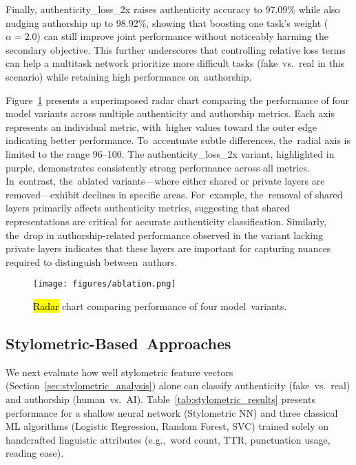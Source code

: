 \documentclass[electronics,article,accept,pdftex,moreauthors,electronics]{Definitions/mdpi}
\begin{document}
Finally, authenticity\_loss\_2x raises authenticity accuracy to 97.09\% while also nudging authorship up to 98.92\%, showing that boosting one task’s weight (\(\alpha=2.0\)) can still improve joint performance without noticeably harming the secondary objective. This further underscores that controlling relative loss terms can help a multitask network prioritize more difficult tasks (fake~vs.~real in this scenario) while retaining high performance on~authorship.

Figure~\ref{fig:ablation-radar} presents a superimposed radar chart comparing the performance of four model variants across multiple authenticity and authorship metrics. Each axis represents an individual metric, with~higher values toward the outer edge indicating better performance. To~accentuate subtle differences, the~radial axis is limited to the range 96--100. The authenticity\_loss\_2x variant, highlighted in purple, demonstrates consistently strong performance across all metrics. In~contrast, the~ablated variants---where either shared or private layers are removed---exhibit declines in specific areas. For~example, the~removal of shared layers primarily affects authenticity metrics, suggesting that shared representations are critical for accurate authenticity classification. Similarly, the~drop in authorship-related performance observed in the variant lacking private layers indicates that these layers are important for capturing nuances required to distinguish between~authors.

\begin{figure}[H]
    \texttt{[image: figures/ablation.png]}
    \caption{\hl{Radar} %
 chart comparing performance of four model~variants.}
    \label{fig:ablation-radar}
\end{figure}


\subsection{Stylometric-Based~Approaches}
\label{sec:res_stylometric}

We next evaluate how well stylometric feature vectors (Section~\ref{sec:stylometric_analysis}) alone can classify authenticity (fake~vs.~real) and authorship (human~vs.~AI). Table~\ref{tab:stylometric_results} presents performance for a shallow neural network (Stylometric NN) and three classical ML algorithms (Logistic Regression, Random Forest, SVC) trained solely on handcrafted linguistic attributes (e.g.,~word count, TTR, punctuation usage, reading ease). 
\end{document}
